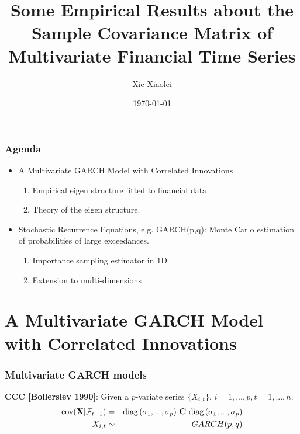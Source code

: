\documentclass{beamer}
\title{Some Empirical Results about the Sample Covariance Matrix of
  Multivariate Financial Time Series}
\author{Xie Xiaolei} %
\institute[UCPH] %
{
University of Copenhagen \\ %
\medskip
\textit{xie@math.ku.dk} %
}
\date{\today} %
\begin{document}
\begin{frame}
\titlepage %
\end{frame}


\begin{frame}
  \frametitle{Agenda}
  \begin{itemize}
  \item A Multivariate GARCH Model with Correlated Innovations
    \begin{enumerate}
    \item Empirical eigen structure fitted to financial data
    \item Theory of the eigen structure.
    \end{enumerate}
  \item Stochastic Recurrence Equations, e.g. GARCH(p,q): Monte Carlo
    estimation of probabilities of large exceedances.
    \begin{enumerate}
    \item Importance sampling estimator in 1D
    \item Extension to multi-dimensions
    \end{enumerate}
  \end{itemize}
\end{frame}

\section{A Multivariate GARCH Model with Correlated Innovations}
\begin{frame}
  \frametitle{Multivariate GARCH models}
  {\bf CCC [Bollerslev 1990]}:
  Given a $p$-variate series $\{X_{i, t}\}$, $i=1,...,p,
  t=1,...,n$.
  \begin{eqnarray*}
    \cov(\vec X | \mathcal F_{t-1}) &=&
    \diag(\sigma_1, ..., \sigma_p) \ 
    \mtx C \ 
    \diag(\sigma_1, ..., \sigma_p) \\
    X_{i, t} &\sim& GARCH(p,q)
  \end{eqnarray*}
\end{frame}
\end{document}

